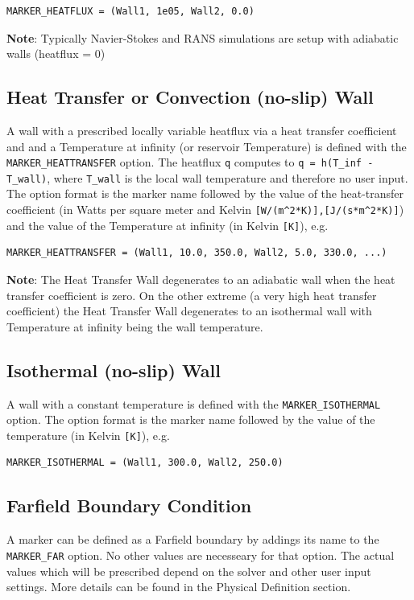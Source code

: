 \documentclass{article}
\begin{document}
\begin{lstlisting}
MARKER_HEATFLUX = (Wall1, 1e05, Wall2, 0.0)
\end{lstlisting}

\textbf{Note}: Typically Navier-Stokes and RANS simulations are setup with adiabatic walls (heatflux = 0)

\subsection{Heat Transfer or Convection (no-slip) Wall}
A wall with a prescribed locally variable heatflux via a heat transfer coefficient and and a Temperature at infinity (or reservoir Temperature) is defined with the \verb|MARKER_HEATTRANSFER| option. The heatflux \verb|q| computes to \verb|q = h(T_inf - T_wall)|, where \verb|T_wall| is the local wall temperature and therefore no user input. The option format is the marker name followed by the value of the heat-transfer coefficient (in Watts per square meter and Kelvin \verb|[W/(m^2*K)],[J/(s*m^2*K)]|) and the value of the Temperature at infinity (in Kelvin \verb|[K]|), e.g.

\begin{lstlisting}
MARKER_HEATTRANSFER = (Wall1, 10.0, 350.0, Wall2, 5.0, 330.0, ...)

\end{lstlisting}


\textbf{Note}: The Heat Transfer Wall degenerates to an adiabatic wall when the heat transfer coefficient is zero. On the other extreme (a very high heat transfer coefficient) the Heat Transfer Wall degenerates to an isothermal wall with Temperature at infinity being the wall temperature.

\subsection{Isothermal (no-slip) Wall}
A wall with a constant temperature is defined with the \verb|MARKER_ISOTHERMAL| option. The option format is the marker name followed by the value of the temperature (in Kelvin \verb|[K]|), e.g.

\begin{lstlisting}
MARKER_ISOTHERMAL = (Wall1, 300.0, Wall2, 250.0)

\end{lstlisting}

\subsection{Farfield Boundary Condition}
A marker can be defined as a Farfield boundary by addings its name to the \verb|MARKER_FAR| option. No other values are necesseary for that option. The actual values which will be prescribed depend on the solver and other user input settings. More details can be found in the Physical Definition section.
\end{document}
